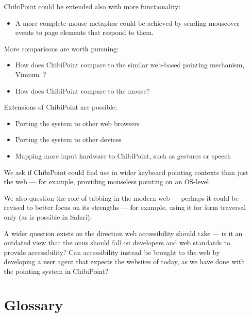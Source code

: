 \documentclass[a4paper, 12pt]{report}
\begin{document}
ChibiPoint could be extended also with more functionality:
\begin{itemize}
\item A more complete mouse metaphor could be achieved by sending mouseover events to page elements that respond to them.
\end{itemize}

More comparisons are worth pursuing:
\begin{itemize}
\item How does ChibiPoint compare to the similar web-based pointing mechanism, Vimium~\cite{vimium}?
\item How does ChibiPoint compare to the mouse?
\end{itemize}

Extensions of ChibiPoint are possible:
\begin{itemize}
\item Porting the system to other web browsers
\item Porting the system to other devices
\item Mapping more input hardware to ChibiPoint, such as gestures or speech
\end{itemize}

We ask if ChibiPoint could find use in wider keyboard pointing contexts than just the web --- for example, providing mouseless pointing on an OS-level.

We also question the role of tabbing in the modern web --- perhaps it could be revised to better focus on its strengths --- for example, using it for form traversal only (as is possible in Safari).

A wider question exists on the direction web accessibility should take --- is it an outdated view that the onus should fall on developers and web standards to provide accessibility? Can accessibility instead be brought to the web by developing a user agent that expects the websites of today, as we have done with the pointing system in ChibiPoint?

\pagebreak
\chapter{Glossary}
\printglossary

\clearpage


{}
\printbibliography
\end{document}
